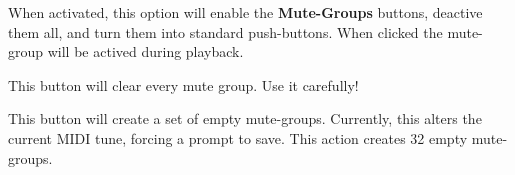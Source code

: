       When activated, this option will enable the \textbf{Mute-Groups} buttons,
      deactive them all, and turn them into standard push-buttons.  When clicked
      the mute-group will be actived during playback.

      This button will clear every mute group. Use it carefully!

      This button will create a set of empty mute-groups.
      Currently, this alters the current MIDI tune, forcing a prompt to save.
      This action creates 32 empty mute-groups.

%

